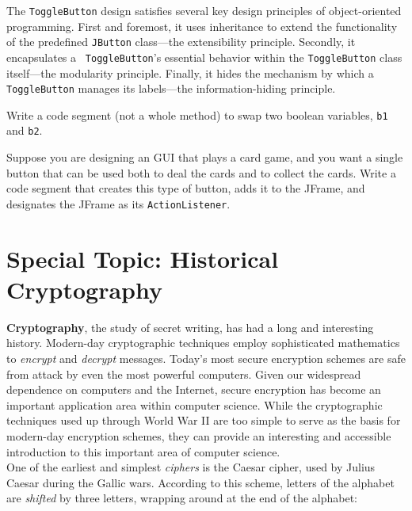 The {\tt ToggleButton} design satisfies several key design
principles of object-oriented
programming.  First and foremost, it uses inheritance to extend the
functionality of the predefined {\tt JButton} class---the
extensibility principle. Secondly, it encapsulates a {\tt
ToggleButton}'s essential behavior within the {\tt ToggleButton} class
itself---the modularity principle. Finally, it hides the mechanism by
which a {\tt ToggleButton} manages its labels---the information-hiding
principle.




\begin{SSTUDY}

\item  Write a code segment (not a whole method) to swap
two boolean variables, {\tt b1} and {\tt b2}.

\item  Suppose you are designing an GUI that plays a
card game, and you want a single button that can
be used both to deal the cards and to collect the cards.
Write a code segment that creates this type of button,
adds it to the JFrame, and designates the JFrame as its
{\tt ActionListener}.

\end{SSTUDY}

\pagebreak
\section*{{\color{cyan}Special Topic:} Historical Cryptography}

{\bf Cryptography}, the study of secret writing,
has had a long and interesting history.   Modern-day cryptographic
techniques employ sophisticated mathematics to
{\it encrypt} and {\it decrypt} messages.  Today's most
\mbox{secure} encryption schemes are safe from attack by even the most
powerful computers.   Given our widespread dependence on computers and
the Internet, secure encryption has become an important application
area within computer science.  While the cryptographic techniques used up
through World War II are too simple to serve as the basis for modern-day encryption 
schemes, they can provide an interesting and accessible
introduction to this important area of computer science.\\
\hspace*{1pc}One of the earliest and simplest {\it ciphers} is the
Caesar cipher, used by Julius Caesar during the
Gallic wars.  According to this scheme, letters of the alphabet are
{\it shifted} by three letters, wrapping around at the end of the
alphabet:

